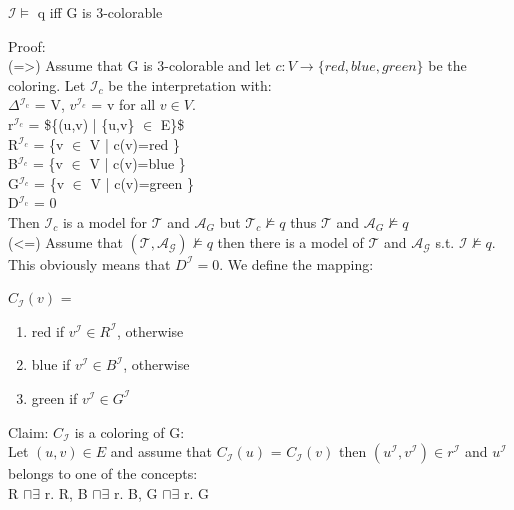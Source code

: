 \documentclass[11pt]{article}
\begin{document}
\begin{enumerate}
\begin{center}
$\mathcal{I} \models$ q iff G is 3-colorable\\
\end{center}
Proof:\\
     (=>) Assume that G is 3-colorable and let $c:V \to \{red,blue,green\}$
be the coloring. Let $\mathcal{I}_{c}$ be the interpretation with:\\
     $\Delta$$^{\mathcal{I}_{\text{c}}}$ = V, $v^{\mathcal{I}_{c}}$ = v for all $v \in V$. \\
     r$^{\mathcal{I}_{c}}$ = \$\{(u,v) | \{u,v\} $\in$ E\}\$\\
     R$^{\mathcal{I}_{c}}$ = \{v $\in$ V | c(v)=red \}\\
     B$^{\mathcal{I}_{c}}$ = \{v $\in$ V | c(v)=blue \}\\
     G$^{\mathcal{I}_{c}}$ = \{v $\in$ V | c(v)=green \}\\
     D$^{\mathcal{I}_{\text{c}}}$ = 0\\
     Then $\mathcal{I}_{c}$ is a model for $\mathcal{T}$ and $\mathcal{A}_{G}$
but $\mathcal{T}_{c} \not \models q$ thus $\mathcal{T}$ and 
$\mathcal{A}_{G} \not \models q$ \\
     (<=) Assume that $(\mathcal{T},\mathcal{A_{G}}) \not \models q$ then
there is a model of $\mathcal{T}$ and $\mathcal{A_{G}}$ s.t. 
$\mathcal{I} \not \models q$. This obviously means that 
$D^{\mathcal{I}} = 0$. We define the mapping:\\
\begin{center}
$C_{\mathcal{I}}(v)$ = 
\begin{enumerate}
\item red if $v^{\mathcal{I}} \in R^{\mathcal{I}}$, otherwise
\item blue if $v^{\mathcal{I}} \in B^{\mathcal{I}}$, otherwise
\item green if $v^{\mathcal{I}} \in G^{\mathcal{I}}$
\end{enumerate}
\end{center}
Claim: $C_{\mathcal{I}}$ is a coloring of G: \\
     Let $(u,v) \in E$ and assume that $C_{\mathcal{I}}(u)$ = $C_{\mathcal{I}}(v)$ 
then $(u^{\mathcal{I}},v^{\mathcal{I}}) \in r^{\mathcal{I}}$ and 
$u^{\mathcal{I}}$ belongs to one of the concepts: \\
     R $\sqcap \exists$ r. R, B $\sqcap \exists$ r. B, G $\sqcap \exists$ r. G \\
\end{enumerate}
\end{document}
